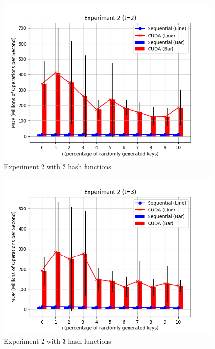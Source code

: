 \documentclass{article}
\begin{document}
\begin{figure}[h!]
    \centering
    \includegraphics[width=\textwidth]{../figs/experiment2_t2.png}
    \caption{Experiment 2 with 2 hash functions}
\end{figure}

\begin{figure}[h!]
    \centering
    \includegraphics[width=\textwidth]{../figs/experiment2_t3.png}
    \caption{Experiment 2 with 3 hash functions}
\end{figure}
\end{document}
